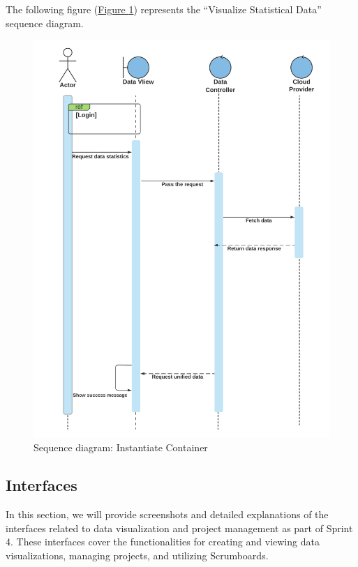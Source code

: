 The following figure (\hyperref[fig:sequence-data]{Figure \ref{fig:sequence-data}})  represents the ``Visualize Statistical Data'' sequence diagram.
\begin{figure}[h]
  \center
  \includegraphics[width=14cm]{./chapters/sprint4/sequence-data.png}
  \caption{Sequence diagram: Instantiate Container}
  \label{fig:sequence-data}
\end{figure}

\subsection{Interfaces}
In this section, we will provide screenshots and detailed explanations of the interfaces related to data visualization and project management as part of Sprint 4. These interfaces cover the functionalities for creating and viewing data visualizations, managing projects, and utilizing Scrumboards.


